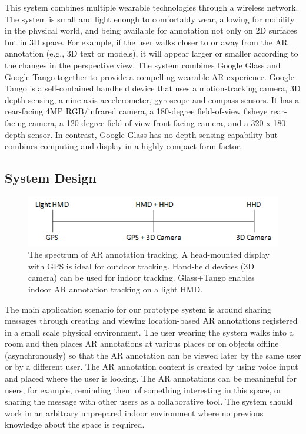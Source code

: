 This system combines multiple wearable technologies through a wireless network. The system is small and light enough to comfortably wear, allowing for mobility in the physical world, and being available for annotation not only on 2D surfaces but in 3D space. For example, if the user walks closer to or away from the AR annotation (e.g., 3D text or models), it will appear larger or smaller according to the changes in the perspective view. The system combines Google Glass and Google Tango together to provide a compelling wearable AR experience. Google Tango is a self-contained handheld device that uses a motion-tracking camera, 3D depth sensing, a nine-axis accelerometer, gyroscope and compass sensors. It has a rear-facing 4MP RGB/infrared camera, a 180-degree field-of-view fisheye rear-facing camera, a 120-degree field-of-view front facing camera, and a 320 x 180 depth sensor. In contrast, Google Glass has no depth sensing capability but combines computing and display in a highly compact form factor. 



\subsection{System Design}

\begin{figure}[ht]
  \centering
  \includegraphics[width=0.8\linewidth]{images/mgia15/tango_paper_continuum.png}
  \caption{The spectrum of AR annotation tracking. A head-mounted display with GPS is ideal for outdoor tracking. Hand-held devices (3D camera) can be used for indoor tracking. Glass+Tango enables indoor AR annotation tracking on a light HMD.}
  \label{fig:mgia15:spectrum}
\end{figure}

The main application scenario for our prototype system is around sharing messages through creating and viewing location-based AR annotations registered in a small scale physical environment. The user wearing the system walks into a room and then places AR annotations at various places or on objects offline (asynchronously) so that the AR annotation can be viewed later by the same user or by a different user. The AR annotation content is created by using voice input and placed where the user is looking. The AR annotations can be meaningful for users, for example, reminding them of something interesting in this space, or sharing the message with other users as a collaborative tool. The system should work in an arbitrary unprepared indoor environment where no previous knowledge about the space is required. 

